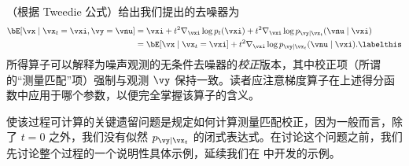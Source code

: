 \documentclass[../../book-main_zh.tex]{subfiles}
\begin{document}
（根据 Tweedie 公式）给出我们提出的去噪器为
\begin{align*}
    \bE[ \vx \mid \vx_t=\vxi, \vy=\vnu]
    &=
    \vxi + t^2 \nabla_{\vxi}\log p_t(\vxi) + t^2 \nabla_{\vxi}\log p_{\vy \mid
    \vx_t}(\vnu \mid \vxi)
    \\
    &=
    \bE[\vx \mid \vx_t=\vxi] + t^2 \nabla_{\vxi}\log p_{\vy \mid \vx_t}(\vnu\mid
    \vxi).
    \labelthis \label{eq:posterior-sampling-denoiser-decomposition}
\end{align*}
所得算子可以解释为噪声观测的无条件去噪器的\textit{校正}版本，其中校正项（所谓的“测量匹配”项）强制与观测 $\vy$ 保持一致。读者应注意梯度算子在上述得分函数中应用于哪个参数，以便完全掌握该算子的含义。

使该过程可计算的关键遗留问题是规定如何计算测量匹配校正，因为一般而言，除了 $t
= 0$ 之外，我们没有似然 $p_{\vy \mid \vx_t}$ 的闭式表达式。在讨论这个问题之前，我们先讨论整个过程的一个说明性具体示例，延续我们在  中开发的示例。
\end{document}
